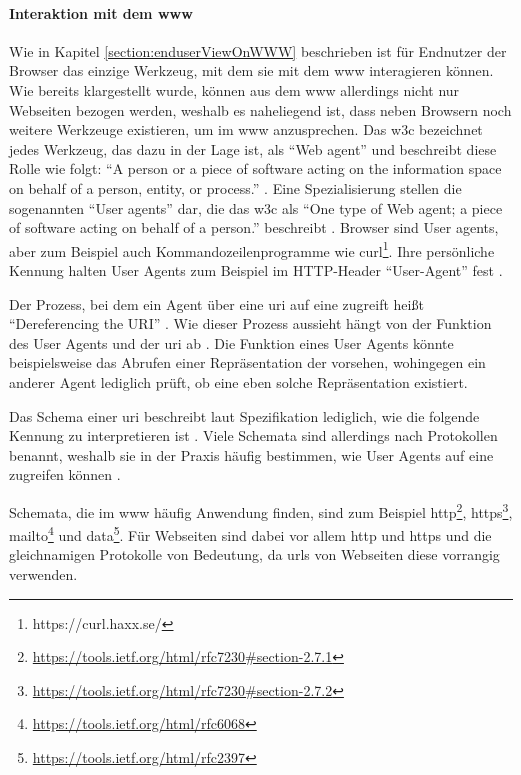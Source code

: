         \paragraph*{Interaktion mit dem \gls{www}}
        Wie in Kapitel \ref{section:enduserViewOnWWW} beschrieben ist für Endnutzer
        der Browser das einzige Werkzeug, mit dem sie mit dem \gls{www}
        interagieren können. Wie bereits klargestellt wurde,
        können aus dem \gls{www} allerdings nicht nur Webseiten bezogen werden,
        weshalb es naheliegend ist, dass neben Browsern noch weitere Werkzeuge existieren,
        um {\resources} im \gls{www} anzusprechen.
        Das \gls{w3c} bezeichnet jedes Werkzeug, das dazu in der Lage ist, als
        "`Web agent"' und beschreibt diese Rolle wie folgt:
        "`A person or a piece of software acting on the information
        space on behalf of a person, entity, or process."' \cite[Kapitel 6]{w3c:wwwArch}.
        Eine Spezialisierung stellen die sogenannten "`User agents"' dar,
        die das \gls{w3c} als "`One type of Web agent;
        a piece of software acting on behalf of a person."' beschreibt \cite[Kapitel 6]{w3c:wwwArch}.
        Browser sind User agents, aber zum Beispiel auch Kommandozeilenprogramme
        wie curl\footnote{https://curl.haxx.se/}.
        Ihre persönliche Kennung halten User Agents zum Beispiel im
        HTTP-Header "`User-Agent"' fest \cite[Kapitel 5.5.3, Seite 46]{rfc:7231}.

        Der Prozess, bei dem ein Agent über eine \gls{uri} auf eine {\resource}
        zugreift heißt "`Dereferencing the URI"' \cite[Kapitel 3.1]{w3c:wwwArch}.
        Wie dieser Prozess aussieht hängt von der Funktion des User Agents und der \gls{uri} ab
        \cite[Kapitel 3.1]{w3c:wwwArch}.
        Die Funktion eines User Agents könnte beispielsweise das Abrufen einer
        Repräsentation der {\resource} vorsehen, wohingegen ein anderer Agent
        lediglich prüft, ob eine eben solche Repräsentation existiert.

        Das Schema einer \gls{uri} beschreibt laut Spezifikation
        lediglich, wie die folgende Kennung zu interpretieren ist
        \cite[Kapitel 3.1, Seite 17]{rfc:3986}.
        Viele Schemata sind allerdings nach Protokollen benannt,
        weshalb sie in der Praxis häufig bestimmen,
        wie User Agents auf eine {\resource} zugreifen können
        \cite[Kapitel 3.1]{w3c:wwwArch}.
        
        Schemata, die im \gls{www} häufig Anwendung finden,
        sind zum Beispiel
        http\footnote{\url{https://tools.ietf.org/html/rfc7230\#section-2.7.1}},
        https\footnote{\url{https://tools.ietf.org/html/rfc7230\#section-2.7.2}},
        mailto\footnote{\url{https://tools.ietf.org/html/rfc6068}} und
        data\footnote{\url{https://tools.ietf.org/html/rfc2397}}.
        Für Webseiten sind dabei vor allem http und https
        und die gleichnamigen Protokolle von Bedeutung,
        da \glspl{url} von Webseiten diese vorrangig verwenden.

